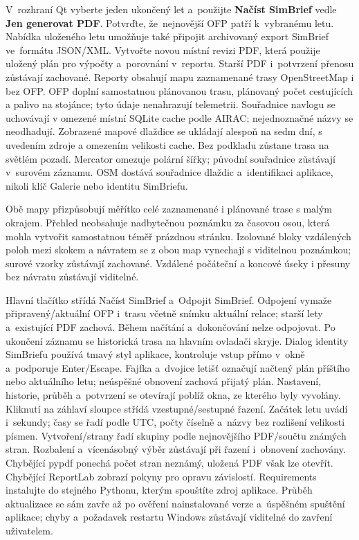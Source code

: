 \documentclass[11pt,a4paper]{article}
\newcommand{\ui}[1]{\textbf{#1}}
\begin{document}
V~rozhraní Qt vyberte jeden ukončený let a~použijte \ui{Načíst SimBrief}
vedle \ui{Jen generovat PDF}. Potvrďte, že~nejnovější OFP patří k~vybranému
letu. Nabídka uloženého letu umožňuje také připojit archivovaný export SimBrief
ve~formátu JSON/XML. Vytvořte novou místní revizi PDF, která použije uložený
plán pro výpočty a~porovnání v~reportu. Starší PDF i~potvrzení přenosu
zůstávají zachované.
Reporty obsahují mapu zaznamenané trasy OpenStreetMap i bez OFP. OFP doplní
samostatnou plánovanou trasu, plánovaný počet cestujících a palivo na stojánce;
tyto údaje nenahrazují telemetrii. Souřadnice navlogu se uchovávají v omezené
místní SQLite cache podle AIRAC; nejednoznačné názvy se neodhadují. Zobrazené
mapové dlaždice se ukládají alespoň na sedm dní, s uvedením zdroje a omezením
velikosti cache. Bez podkladu zůstane trasa na světlém pozadí. Mercator omezuje
polární šířky; původní souřadnice zůstávají v~surovém záznamu. OSM dostává
souřadnice dlaždic a~identifikaci aplikace, nikoli klíč Galerie nebo identitu
SimBriefu.

Obě mapy přizpůsobují měřítko celé zaznamenané i plánované trase s malým
okrajem. Přehled neobsahuje nadbytečnou poznámku za časovou osou, která
mohla vytvořit samostatnou téměř prázdnou stránku.
Izolované bloky vzdálených poloh mezi skokem a návratem se z obou map
vynechají s viditelnou poznámkou; surové vzorky zůstávají zachované.
Vzdálené počáteční a koncové úseky i přesuny bez návratu zůstávají viditelné.

Hlavní tlačítko střídá Načíst SimBrief a~Odpojit SimBrief. Odpojení
vymaže připravený/aktuální OFP i~trasu včetně snímku aktuální relace;
starší lety a~existující PDF zachová. Během načítání a~dokončování nelze
odpojovat. Po ukončení záznamu se historická trasa na hlavním ovladači skryje.
Dialog identity SimBriefu používá tmavý styl aplikace, kontroluje vstup přímo
v~okně a~podporuje Enter/Escape. Fajfka a~dvojice letišť označují načtený plán
příštího nebo aktuálního letu; neúspěšné obnovení zachová přijatý plán.
Nastavení,
historie, průběh a~potvrzení se otevírají poblíž okna, ze kterého byly vyvolány.
Kliknutí na záhlaví sloupce střídá vzestupné/sestupné řazení. Začátek letu uvádí
i~sekundy; časy se řadí podle UTC, počty číselně a~názvy bez rozlišení velikosti
písmen. Vytvoření/strany řadí skupiny podle nejnovějšího PDF/součtu známých
stran.
Rozbalení a~vícenásobný výběr zůstávají při řazení i~obnovení zachovány.
Chybějící pypdf ponechá počet stran neznámý, uložená PDF však lze otevřít.
Chybějící ReportLab zobrazí pokyny pro opravu závislostí. Requirements
instalujte
do stejného Pythonu, kterým spouštíte zdroj aplikace. Průběh aktualizace se sám
zavře až po ověření nainstalované verze a~úspěšném spuštění aplikace; chyby
a~požadavek restartu Windows zůstávají viditelné do zavření uživatelem.
\end{document}
